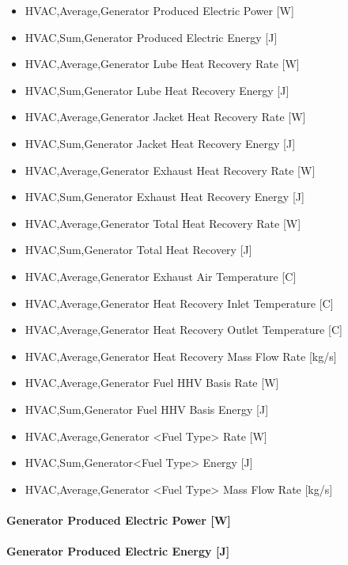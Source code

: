 \begin{itemize}
\item
  HVAC,Average,Generator Produced Electric Power {[}W{]}
\item
  HVAC,Sum,Generator Produced Electric Energy {[}J{]}
\item
  HVAC,Average,Generator Lube Heat Recovery Rate {[}W{]}
\item
  HVAC,Sum,Generator Lube Heat Recovery Energy {[}J{]}
\item
  HVAC,Average,Generator Jacket Heat Recovery Rate {[}W{]}
\item
  HVAC,Sum,Generator Jacket Heat Recovery Energy {[}J{]}
\item
  HVAC,Average,Generator Exhaust Heat Recovery Rate {[}W{]}
\item
  HVAC,Sum,Generator Exhaust Heat Recovery Energy {[}J{]}
\item
  HVAC,Average,Generator Total Heat Recovery Rate {[}W{]}
\item
  HVAC,Sum,Generator Total Heat Recovery {[}J{]}
\item
  HVAC,Average,Generator Exhaust Air Temperature {[}C{]}
\item
  HVAC,Average,Generator Heat Recovery Inlet Temperature {[}C{]}
\item
  HVAC,Average,Generator Heat Recovery Outlet Temperature {[}C{]}
\item
  HVAC,Average,Generator Heat Recovery Mass Flow Rate {[}kg/s{]}
\item
  HVAC,Average,Generator Fuel HHV Basis Rate {[}W{]}
\item
  HVAC,Sum,Generator Fuel HHV Basis Energy {[}J{]}
\item
  HVAC,Average,Generator \textless{}Fuel Type\textgreater{} Rate {[}W{]}
\item
  HVAC,Sum,Generator\textless{}Fuel Type\textgreater{} Energy {[}J{]}
\item
  HVAC,Average,Generator \textless{}Fuel Type\textgreater{} Mass Flow Rate {[}kg/s{]}
\end{itemize}

\paragraph{Generator Produced Electric Power {[}W{]}}\label{generator-produced-electric-power-w}

\paragraph{Generator Produced Electric Energy {[}J{]}}\label{generator-produced-electric-energy-j}

